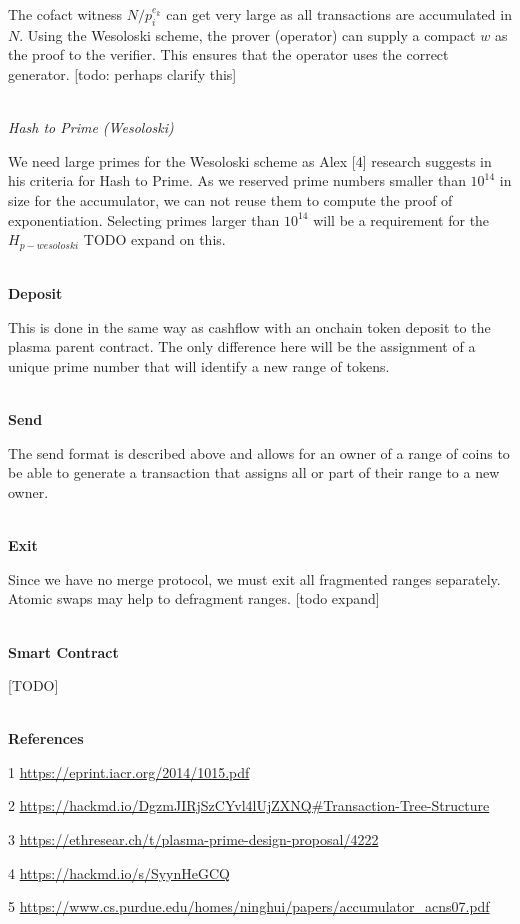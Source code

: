 \documentclass[12pt]{article}
\begin{document}
The cofact witness $N/p_i^{e_k}$ can get very large as all transactions are accumulated in $N$. Using the Wesoloski scheme, the prover (operator) can supply a compact $w$ as the proof to the verifier. This ensures that the operator uses the correct generator. [todo: perhaps clarify this]
\\
\\
\centerline{\textit{Hash to Prime (Wesoloski)}}

We need large primes for the Wesoloski scheme as Alex [4] research suggests in his criteria for Hash to Prime. As we reserved prime numbers smaller than $10^14$ in size for the accumulator, we can not reuse them to compute the proof of exponentiation. Selecting primes larger than $10^14$ will be a requirement for the $H_{p-wesoloski}$ TODO expand on this. 
\\ 
\\
\centerline{\textbf{Deposit}}

This is done in the same way as cashflow with an onchain token deposit to the plasma parent contract. The only difference here will be the assignment of a unique prime number that will identify a new range of tokens. 
\\
\\
\centerline{\textbf{Send}}

The send format is described above and allows for an owner of a range of coins to be able to generate a transaction that assigns all or part of their range to a new owner. 
\\
\\
\centerline{\textbf{Exit}}

Since we have no merge protocol, we must exit all fragmented ranges separately. Atomic swaps may help to defragment ranges. [todo expand]
\\
\\
\centerline{\textbf{Smart Contract}}

[TODO]
\\
\\
\centerline{\textbf{References}}

1 \url{https://eprint.iacr.org/2014/1015.pdf}

2 \url{https://hackmd.io/DgzmJIRjSzCYvl4lUjZXNQ#Transaction-Tree-Structure}

3 \url{https://ethresear.ch/t/plasma-prime-design-proposal/4222}

4 \url{https://hackmd.io/s/SyynHeGCQ}

5 \url{https://www.cs.purdue.edu/homes/ninghui/papers/accumulator_acns07.pdf}
\end{document}
